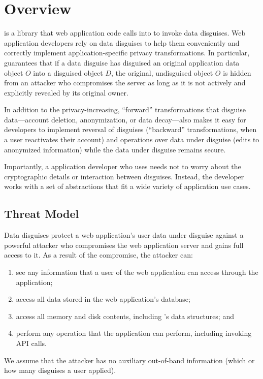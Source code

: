 \section{\sys Overview}
\label{s:overview}

%
\sys is a library that web application code calls into to invoke data disguises.
%
Web application developers rely on data disguises to help them conveniently and
correctly implement application-specific privacy transformations.
%
In particular, \sys guarantees that if a data disguise has disguised an original
application data object $O$ into a disguised object $D$, the original, undisguised
object $O$ is hidden from an attacker who compromises the server as long as it is
not actively and explicitly revealed by its original owner.
%

%
In addition to the privacy-increasing, ``forward'' transformations that disguise
data---\eg account deletion, anonymization, or data decay---\sys also makes it easy for
developers to implement reversal of disguises (``backward'' transformations, \eg when a
user reactivates their account) and operations over data under disguise (\eg edits to
anonymized information) while the data under disguise remains secure.
%

%
Importantly, a application developer who uses \sys needs not to worry about the
cryptographic details or interaction between disguises.
%
Instead, the developer works with a set of abstractions that fit a wide
variety of application use cases.
%

\subsection{Threat Model}
\label{s:threat}

%
Data disguises protect a web application's user data under disguise against a
powerful attacker who compromises the web application server and gains full
access to it.
%
As a result of the compromise, the attacker can:
\begin{enumerate}[nosep]
 \item see any information that a user of the web application can access through
   the application;
  \item access all data stored in the web application's database;
  \item access all memory and disk contents, including \sys's data structures; and
  \item perform any operation that the application can perform, including invoking
    \sys API calls.
\end{enumerate}
%
We assume that the attacker has no auxiliary out-of-band information (\eg which or
how many disguises a user applied).
%

